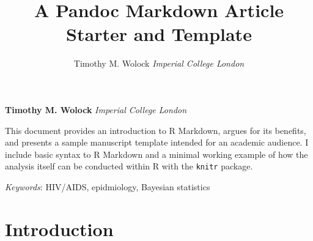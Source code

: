 \documentclass[10pt,a4paper]{article}
\title{A Pandoc Markdown Article Starter and Template  }
\author{\Large Timothy M. Wolock\vspace{0.05in} \newline\normalsize\emph{Imperial College London}  }
\date{}
\newcommand*{\authorfont}{\fontfamily{phv}\selectfont}
\renewenvironment{abstract}
 {{%
    \setlength{\leftmargin}{0mm}
    \setlength{\rightmargin}{\leftmargin}%
  }%
  \relax}
 {\endlist}
\begin{document}
	
%

{%
\setlength{\parindent}{0pt}
\thispagestyle{plain}
{\fontsize{18}{20}\selectfont\raggedright 
\maketitle  %

}

{
   \vskip 13.5pt\relax \normalsize\fontsize{11}{12} 
\textbf{\authorfont Timothy M. Wolock} \hskip 15pt \emph{\small Imperial College London}   

}

}








\begin{abstract}

    \hbox{\vrule height .2pt width 5.3in}

    \vskip 8.5pt %

\noindent This document provides an introduction to R Markdown, argues for its
benefits, and presents a sample manuscript template intended for an
academic audience. I include basic syntax to R Markdown and a minimal
working example of how the analysis itself can be conducted within R
with the \texttt{knitr} package.


\vskip 8.5pt \noindent \emph{Keywords}: HIV/AIDS, epidmiology, Bayesian statistics \par

    \hbox{\vrule height .2pt width 5.3in}



\end{abstract}


\vskip -8.5pt



\noindent \onehalfspacing 

\hypertarget{introduction}{%
\section{Introduction}\label{introduction}}
\end{document}
